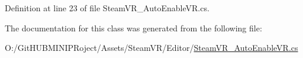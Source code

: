 Definition at line 23 of file Steam\+V\+R\+\_\+\+Auto\+Enable\+V\+R.\+cs.



The documentation for this class was generated from the following file\+:\begin{DoxyCompactItemize}
\item 
O\+:/\+Git\+H\+U\+B\+M\+I\+N\+I\+P\+Roject/\+Assets/\+Steam\+V\+R/\+Editor/\mbox{\hyperlink{_steam_v_r___auto_enable_v_r_8cs}{Steam\+V\+R\+\_\+\+Auto\+Enable\+V\+R.\+cs}}\end{DoxyCompactItemize}
